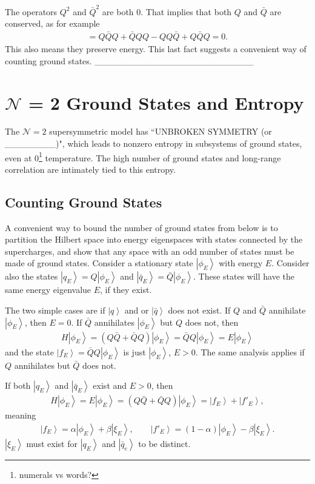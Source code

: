 \documentclass[12pt]{article} %
\renewcommand{\cal}{\mathcal}
\newcommand{\ket}[1]{\left|#1\right\rangle}
\begin{document}
The operators $Q^2$ and $\bar Q^2$ are both 0. That implies that both $Q$ and $\bar Q$ are conserved, as for example
\begin{align}
[H,Q] = Q\bar QQ + \bar QQQ - QQ\bar Q + Q\bar QQ = 0.
\end{align}
This also means they preserve energy. This last fact suggests a convenient way of counting ground states. \_\_\_\_\_\_\_\_\_\_\_\_\_\_\_\_\_\_\_\_\_\_\_\_\_

\section{$\cal{N}$ = 2 Ground States and Entropy}

The $\cal N = 2$ supersymmetric model has ``UNBROKEN SYMMETRY (or \_\_\_\_\_\_\_\_)", which leads to nonzero entropy in subsystems of ground states, even at 0\footnote{numerals vs words?} temperature. The high number of ground states and long-range correlation are intimately tied to this entropy.

\subsection{Counting Ground States} \emph{}

A convenient way to bound the number of ground states from below is to partition the Hilbert space into energy eigenspaces with states connected by the supercharges, and show that any space with an odd number of states must be made of ground states. Consider a stationary state $\ket{\phi_E}$ with energy $E$. Consider also the states $\ket{q_E} = Q\ket{\phi_E}$ and $\ket{\bar q_E}= \bar Q \ket{\phi_E}$. These states will have the same energy eigenvalue $E$, if they exist. 

The two simple cases are if $\ket{q}$ and or $\ket{\bar q}$ does not exist. If $Q$ and $\bar Q$ annihilate $\ket{\phi_E}$, then $E=0$. If $\bar Q$ annihilates $\ket{\phi_E}$ but $Q$ does not, then 
\begin{align}
H\ket{\phi_E} = (Q\bar{Q} + \bar QQ)\ket{\phi_E} = \bar QQ\ket{\phi_E} = E\ket{\phi_E}
\end{align}
and the state $\ket{f_E} = \bar QQ\ket{\phi_E}$ is just $\ket{\phi_E}$, $E>0$. The same analysis applies if $Q$ annihilates but $\bar Q$ does not.

If both $\ket{q_E}$ and $\ket{\bar q_E}$ exist and $E>0$, then
\begin{align}
H\ket{\phi_E} = E\ket{\phi_E} = (Q\bar Q + \bar QQ)\ket{\phi_E} = \ket{f_E} + 
	\ket{f'_E},
\end{align}
meaning 
\begin{align}
\ket{f_E} = \alpha\ket{\phi_E} + \beta\ket{\xi_E},\qquad \ket{f'_E} = 
	(1-\alpha)\ket{\phi_E} - \beta\ket{\xi_E}.
\end{align}
$\ket{\xi_E}$ must exist for $\ket{q_E}$ and $\ket{\bar q_e}$ to be distinct.
\end{document}
